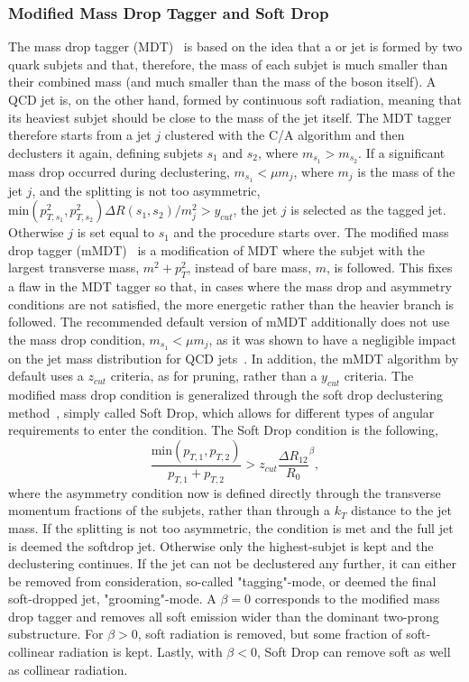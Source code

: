 \subsubsection{Modified Mass Drop Tagger and Soft Drop}
\label{sec:objreco:softdrop}
The mass drop tagger (MDT)~\cite{Butterworth:2008iy} is based on the idea that a \PW or \PZ jet is formed by two quark subjets and that, therefore, the mass of each subjet is much smaller than their combined mass (and much smaller than the mass of the boson itself). A QCD jet is, on the other hand, formed by continuous soft radiation, meaning that its heaviest subjet should be close to the mass of the jet itself. The MDT tagger therefore starts from a jet $j$ clustered with the C/A algorithm and then declusters it again, defining subjets $s_1$ and $s_2$, where $m_{s_1} > m_{s_2}$. If a significant mass drop occurred during declustering, $m_{s_1} < \mu m_{j}$, where $m_{j}$ is the mass of the jet $j$, and the splitting is not too asymmetric, $\textrm{min}(p^2_{T,s_1}, p^2_{T,s_2})\Delta R(s_1,s_2)/m^2_{j} > y_{cut}$, the jet $j$ is selected as the tagged jet. Otherwise $j$ is set equal to $s_1$ and the procedure starts over. The modified mass drop tagger (mMDT)~\cite{Dasgupta:2013ihk} is a modification of MDT where the subjet with the largest transverse mass, $m^2+p_T^2$, instead of bare mass, $m$, is followed. This fixes a flaw in the MDT tagger so that, in cases where the mass drop and asymmetry conditions are not satisfied, the more energetic rather than the heavier branch is followed. The recommended default version of mMDT additionally does not use the mass drop condition, $m_{s_1} < \mu m_{j}$, as it was shown to have a negligible impact on the jet mass distribution for QCD jets~\cite{Dasgupta:2013ihk}. In addition, the mMDT algorithm by default uses a $z_{cut}$ criteria, as for pruning, rather than a $y_{cut}$ criteria. The modified mass drop condition is generalized through the soft drop declustering method~\cite{Larkoski:2014wba}, simply called Soft Drop, which allows for different types of angular requirements to enter the condition. The Soft Drop condition is the following,
\begin{equation}
  \label{eq:softdrop}
\frac{ \textrm{min}(p_{T,1},p_{T,2}) }{ p_{T,1}+p_{T,2} } > z_{cut} \frac{\Delta R_{12}}{R_0}^\beta,
\end{equation}
where the asymmetry condition now is defined directly through the transverse momentum fractions of the subjets, rather than through a $k_T$ distance to the jet mass. If  the splitting is not too asymmetric, the condition is met and the full jet is deemed the softdrop jet. Otherwise only the highest-\PT subjet is kept and the declustering continues. If the jet can not be declustered any further, it can either be removed from consideration, so-called "tagging"-mode, or deemed the final soft-dropped jet, "grooming"-mode. A $\beta=0$ corresponds to the modified mass drop tagger and removes all soft emission wider than the dominant two-prong substructure. For $\beta>0$, soft radiation is removed, but some fraction of soft-collinear radiation is kept. Lastly, with $\beta<0$, Soft Drop can remove soft as well as collinear radiation.
